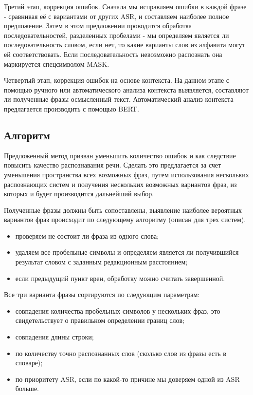 \documentclass[conference]{IEEEtran}
\begin{document}
Третий этап, коррекция ошибок. Сначала мы исправляем ошибки в каждой фразе - сравнивая её с вариантами от других ASR, и составляем наиболее полное предложение. Затем в этом предложении проводится обработка последовательностей, разделенных пробелами - мы определяем является ли последовательность словом, если нет, то какие варианты слов из алфавита могут ей соответствовать. Если последовательность невозможно распознать она маркируется спецсимволом MASK.

Четвертый этап, коррекция ошибок на основе контекста. На данном этапе с помощью ручного или автоматического анализа контекста выявляется, составляют ли полученные фразы осмысленный текст. Автоматический анализ контекста предлагается производить с помощью BERT.

\subsection{Алгоритм}
Предложенный метод призван уменьшить количество ошибок и как следствие повысить качество распознавания речи. Сделать это предлагается за счет уменьшения пространства всех возможных фраз, путем использования нескольких распознающих систем и получения нескольких возможных вариантов фраз, из которых и будет производится дальнейший выбор.

Полученные фразы должны быть сопоставлены, выявление наиболее вероятных вариантов фраз происходит по следующему алгоритму (описан для трех систем).

\begin{itemize}
\item проверяем не состоит ли фраза из одного слова;
\item удаляем все пробельные символы и определяем является ли получившийся результат словом с заданным редакционным расстоянием;
\item если предыдущий пункт врен, обработку можно считать завершенной.
\end{itemize}

Все три варианта фразы сортируются по следующим параметрам:

\begin{itemize}
\item совпадения количества пробельных символов у нескольких фраз, это свидетельствует о правильном определении границ слов;
\item совпадения длины строки;
\item по количеству точно распознанных слов (сколько слов из фразы есть в словаре);
\item по приоритету ASR, если по какой-то причине мы доверяем одной из ASR больше.
\end{itemize}
\end{document}
